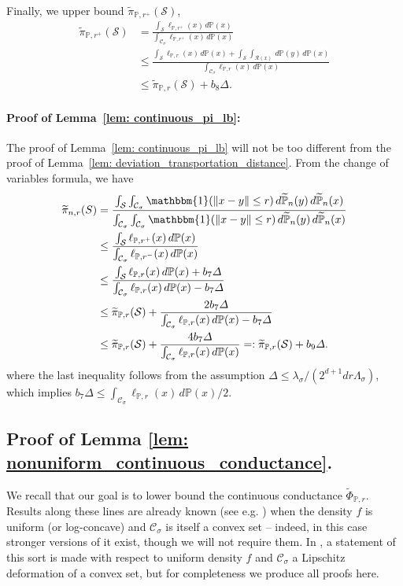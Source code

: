 \documentclass[11pt,twoside]{article}
\theoremstyle{definition}
\newcommand{\norm}[1]{\left\lVert#1\right\rVert}
\newcommand{\1}{\mathbbm{1}}
\newcommand{\Pbb}{\mathbb{P}}
\newcommand{\Sset}{\mathcal{S}}
\newcommand{\Cset}{\mathcal{C}}
\newcommand{\Csig}{\Cset_{\sigma}}
\begin{document}
Finally, we upper bound $\widetilde{\pi}_{\Pbb,r^{+}}(\Sset)$,
\begin{align*}
\widetilde{\pi}_{\Pbb,r^{+}}(\Sset) & = \frac{\int_{\Sset} \ell_{\Pbb,r^+}(x) \,d\Pbb(x)}{\int_{\Csig} \ell_{\Pbb,r^+}(x) \,d\Pbb(x)} \\
& \leq \frac{\int_{\Sset} \ell_{\Pbb,r}(x) \,d\Pbb(x) + \int_{\Sset} \int_{\mathcal{R}(x)} \,d\Pbb(y) \,d\Pbb(x)}{\int_{\Csig} \ell_{\Pbb,r}(x) \,d\Pbb(x)} \\
& \leq \widetilde{\pi}_{\Pbb,r}(\Sset) + b_8\varDelta.
\end{align*}

\paragraph{Proof of Lemma~\ref{lem: continuous_pi_lb}: }
The proof of Lemma~\ref{lem: continuous_pi_lb} will not be too different from the proof of Lemma~\ref{lem: deviation_transportation_distance}. From the change of variables formula, we have
\begin{align*}
\widetilde{\pi}_{n,r}(S) & = \frac{\int_{\Sset}\int_{\Csig} \1(\norm{x - y} \leq r) \,d\widetilde{\Pbb}_n(y) \,d\widetilde{\Pbb}_n(x)}{\int_{\Csig}\int_{\Csig} \1(\norm{x - y} \leq r) \,d\widetilde{\Pbb}_n(y) \,d\widetilde{\Pbb}_n(x)} \\
& \leq \frac{\int_{\Sset} \ell_{\Pbb,r^+}(x) \,d\Pbb(x) }{\int_{\Csig}\ell_{\Pbb,r^-}(x) \,d\Pbb(x)} \\
& \leq \frac{\int_{\Sset} \ell_{\Pbb,r}(x) \,d\Pbb(x) + b_7\varDelta}{\int_{\Csig} \ell_{\Pbb,r}(x) \,d\Pbb(x) - b_7\varDelta} \\
& \leq \widetilde{\pi}_{\Pbb,r}(\Sset) + \frac{2b_7\varDelta}{\int_{\Csig} \ell_{\Pbb,r}(x) \,d\Pbb(x) - b_7\varDelta} \\
& \leq \widetilde{\pi}_{\Pbb,r}(\Sset) + \frac{4b_7\varDelta}{\int_{\Csig} \ell_{\Pbb,r}(x) \,d\Pbb(x)} =: \widetilde{\pi}_{\Pbb,r}(\Sset) + b_9 \varDelta.
\end{align*}
where the last inequality follows from the assumption $\varDelta \leq \lambda_{\sigma}/(2^{d + 1} dr\Lambda_{\sigma})$, which implies $b_7\varDelta \leq \int_{\Csig}\ell_{\Pbb,r}(x) \,d\Pbb(x) / 2$.

\subsection{Proof of Lemma \ref{lem: nonuniform_continuous_conductance}. }
We recall that our goal is to lower bound the continuous conductance $\widetilde{\Phi}_{\Pbb,r}$. Results along these lines are already known (see e.g. \cite{kannan04}) when the density $f$ is uniform (or log-concave) and $\Csig$ is itself a convex set -- indeed, in this case stronger versions of it exist, though we will not require them. In \cite{abbasi-yadkori2016a}, a statement of this sort is made with respect to uniform density $f$ and $\Csig$ a Lipschitz deformation of a convex set, but for completeness we produce all proofs here.
\end{document}
